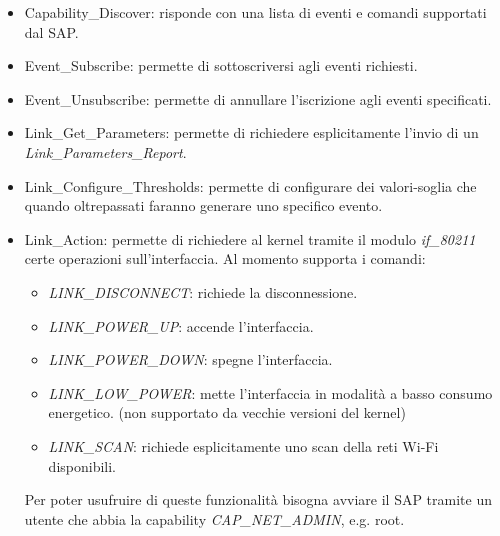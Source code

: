 \begin{itemize}
\item Capability\_Discover: risponde con una lista di eventi e comandi supportati dal SAP.
\item Event\_Subscribe: permette di sottoscriversi agli eventi richiesti.
\item Event\_Unsubscribe: permette di annullare l'iscrizione agli eventi specificati.
\item Link\_Get\_Parameters: permette di richiedere esplicitamente l'invio di un {\em Link\_Parameters\_Report}.
\item Link\_Configure\_Thresholds: permette di configurare dei valori-soglia che quando oltrepassati faranno generare uno specifico evento.
\item Link\_Action: permette di richiedere al kernel tramite il modulo {\em if\_80211} certe operazioni sull'interfaccia. Al momento supporta i comandi:

\begin{itemize}
\item {\em LINK\_DISCONNECT}: richiede la disconnessione.

\item {\em LINK\_POWER\_UP}: accende l'interfaccia.

\item {\em LINK\_POWER\_DOWN}: spegne l'interfaccia.

\item {\em LINK\_LOW\_POWER}: mette l'interfaccia in modalità a basso consumo energetico. (non supportato da vecchie versioni del kernel)

\item {\em LINK\_SCAN}: richiede esplicitamente uno scan della reti Wi-Fi disponibili.

\end{itemize}
Per poter usufruire di queste funzionalità bisogna avviare il SAP tramite un utente che abbia la capability {\em CAP\_NET\_ADMIN}, e.g. root.
\end{itemize}

